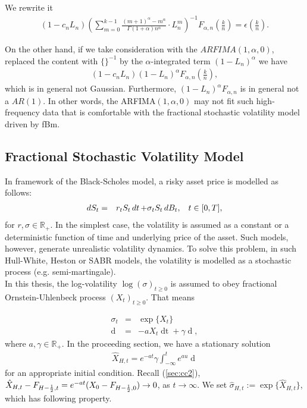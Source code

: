 \documentclass[a4paper, twoside, 11pt]{article}
\theoremstyle{definition}
\newcommand{\brkt}[1]{\left({#1} \right)}
\begin{document}
  We rewrite it
  \begin{eqnarray*}
	(1-c_nL_n)\brkt{\sum_{m=0}^{k-1} \frac{(m + 1)^\alpha - m^\alpha}{\Gamma(1+\alpha)n^\alpha} \cdot L_n^m}^{-1}  F_{\alpha,n}(\frac{k}{n}) =\epsilon(\frac{k}{n}).
  \end{eqnarray*}

  On the other hand, if we take consideration with the $ARFIMA(1, \alpha, 0)$, replaced the content with $\{\}^{-1}$ by the $\alpha$-integrated term $(1-L_n)^\alpha$  we have
  \begin{eqnarray*}
	(1-c_nL_n) (1-L_n)^\alpha F_{\alpha,n}(\frac{k}{n}),
  \end{eqnarray*}
  which is in general not Gaussian. Furthermore, $(1-L_n)^\alpha F_{\alpha,n}$ is in general not a $AR(1)$.  In other words, the ARFIMA$(1, \alpha, 0)$ may not fit such high-frequency data that is comfortable with the fractional stochastic volatility model driven by fBm. 

  \subsection{Fractional Stochastic Volatility Model}
  In framework of the Black-Scholes model, a risky asset price is modelled as follows:
  \begin{eqnarray}
	\mathop{dS_t} &=& r_tS_t\mathop{dt} + \sigma_t S_t \mathop{dB_t},\hspace{3mm} t\in [0, T],
  \end{eqnarray}
  for $r, \sigma \in \mathbb{R}_{+}$. In the simplest case, the volatility is assumed as a constant or a deterministic function of time and underlying price of the asset. Such models, however, generate unrealistic volatility dynamics. To solve this problem, in 
  such  Hull-White, Heston or SABR models, the volatility is modelled as a stochastic process (e.g. semi-martingale).\\
  In this thesis, the log-volatility $\log(\sigma)_{t \ge 0}$ is assumed to obey fractional Ornstein-Uhlenbeck process $(X_t)_{t\ge0}$. That means

  \begin{eqnarray}
	\sigma_t &=& \exp\{X_t\} \nonumber\\
	\mathop{dX_t} &=&  -a X_t \mathop{dt} + \gamma \mathop{dU_H(t)},
	\label{sec:fv}
  \end{eqnarray}
  where $a, \gamma \in \mathbb{R}_{+}$. In the proceeding section, we have a stationary solution 
  \begin{eqnarray}
  \hat{X}_{H,t}= e^{-at}\gamma\int_{-\infty}^t e^{au}\mathop{dU_H(u)}
  \label{sec:fv2}
  \end{eqnarray}
  for an appropriate initial condition. Recall (\ref{sec:cc2}), $\hat{X}_{H,t} -  F_{H-\frac{1}{2},t} = \\e^{-at}(X_0 - F_{H-\frac{1}{2},0})\rightarrow 0 $, as $t\rightarrow \infty$. We set $\hat{\sigma}_{H,t} := \exp\{\hat{X}_{H,t}\}$, which has following property. %
\end{document}
